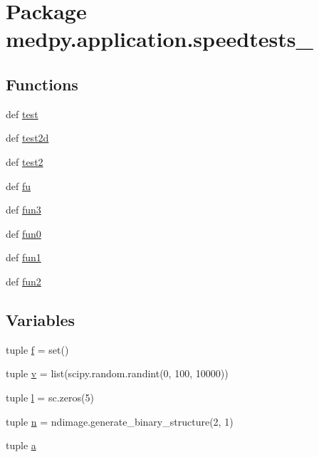\hypertarget{namespacemedpy_1_1application_1_1speedtests__2}{
\section{Package medpy.application.speedtests\_}
\label{namespacemedpy_1_1application_1_1speedtests__2}
}
\subsection*{Functions}
\begin{DoxyCompactItemize}
\item 
def \hyperlink{namespacemedpy_1_1application_1_1speedtests__2_a560bb5b59474c612f42e572720803bdb}{test}
\item 
def \hyperlink{namespacemedpy_1_1application_1_1speedtests__2_accd903216c72a9990aedcdeed56b2ad9}{test2d}
\item 
def \hyperlink{namespacemedpy_1_1application_1_1speedtests__2_a30bd128a88482aba77ce1733e6967c38}{test2}
\item 
def \hyperlink{namespacemedpy_1_1application_1_1speedtests__2_a8c51d38798365ce9421c6bea1b339fce}{fu}
\item 
def \hyperlink{namespacemedpy_1_1application_1_1speedtests__2_a179ca1a061b79915a5bfe31ddcfb1197}{fun3}
\item 
def \hyperlink{namespacemedpy_1_1application_1_1speedtests__2_a9ad7e2f7ed2443479d6591d1974c5847}{fun0}
\item 
def \hyperlink{namespacemedpy_1_1application_1_1speedtests__2_a7096cb67cdebb92ee0edabad37625513}{fun1}
\item 
def \hyperlink{namespacemedpy_1_1application_1_1speedtests__2_a83c07154eae04ee038c37b13f871ebd0}{fun2}
\end{DoxyCompactItemize}
\subsection*{Variables}
\begin{DoxyCompactItemize}
\item 
tuple \hyperlink{namespacemedpy_1_1application_1_1speedtests__2_a0a31d91909217760aae9b0c83e2c79f9}{f} = set()
\item 
tuple \hyperlink{namespacemedpy_1_1application_1_1speedtests__2_ad5ab13c356386ad692ee61da9e5a1541}{v} = list(scipy.random.randint(0, 100, 10000))
\item 
tuple \hyperlink{namespacemedpy_1_1application_1_1speedtests__2_a4357bcd463b2c880ffbc17090ab777d4}{l} = sc.zeros(5)
\item 
tuple \hyperlink{namespacemedpy_1_1application_1_1speedtests__2_ad60bd8592e169db611d77aeb7441a26f}{n} = ndimage.generate\_\-binary\_\-structure(2, 1)
\item 
tuple \hyperlink{namespacemedpy_1_1application_1_1speedtests__2_a54c72c7d7bc90d10313234ac6a94b336}{a}
\end{DoxyCompactItemize}


